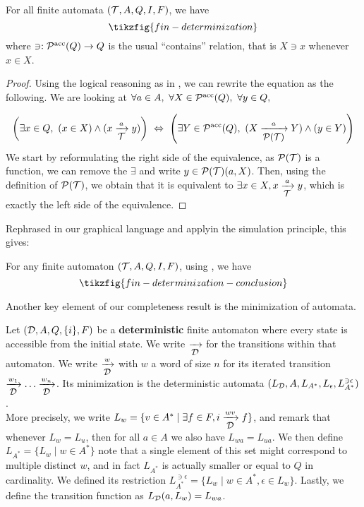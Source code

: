 \begin{proposition}\label{prop:determinization}
	For all finite automata $(\T,A,Q,I,F)$, we have
	\[ \tikzfig{fin-determinization}\]
	where $\ni : \P^{\textup{acc}}(Q) \to Q$ is the usual ``contains'' relation, that is $X \ni x$ whenever $x \in X$.
\end{proposition}
\begin{proof}
	Using the logical reasoning as in , we can rewrite the equation as the following. We are looking at $\forall a\in A,~ \forall X\in \P^{\textup{acc}}(Q),~\forall y\in Q,~$
	
	\[ \left(\exists x\in Q,~ (x\in X) \land (x \xrightarrow[\text{\small$\T$}]{a} y)\right) ~\Leftrightarrow~ \left(\exists Y\in \P^{\textup{acc}}(Q),~   (X \xrightarrow[\text{\small$\P(\T)$}]{a} Y) \land (y\in Y)\right)\]
	We start by reformulating the right side of the equivalence, as $\P(\T)$ is a function, we can remove the $\exists$ and write $y \in \P(\T)(a,X)$. Then, using the definition of $ \P(\T)$, we obtain that it is equivalent to $\exists x \in X, x \xrightarrow[\text{\small$\T$}]{a} y$, which is exactly the left side of the equivalence.
\end{proof}

Rephrased in our graphical language and applyin the simulation principle, this gives:
\begin{corollary}\label{cor:determinization}
	For any finite automaton $(\T,A,Q,I,F)$, using , we have
	\[ \tikzfig{fin-determinization-conclusion}\]
\end{corollary}

Another key element of our completeness result is the minimization of automata.
\begin{definition}[Minimization]	
	Let $(\D,A,Q,\{i\},F)$ be a \textbf{deterministic} finite automaton where every state is accessible from the initial state. We write $\xrightarrow[\text{\small $\D$}]{}$ for the transitions within that automaton. We write  $\xrightarrow[\text{\small $\D$}]{w}$ with $w$ a word of size $n$ for its iterated transition $\xrightarrow[\text{\small $\D$}]{w_1}\dots \xrightarrow[\text{\small $\D$}]{w_n}$. Its minimization is the deterministic automata 
	$ (L_\D,A,L_{A^*},L_{\epsilon},L_{A^*}^{\ni \epsilon}) $.\\
	More precisely, we write $L_w = \{ v \in A^* \mid \exists f \in F, i \xrightarrow[\text{\small $\D$}]{wv} f\}$, and remark that whenever $L_w = L_u$, then for all $a \in A$ we also have $L_{wa} = L_{ua}$. We then define $L_{A^*} = \{ L_w \mid w \in A^*\}$ note that a single element of this set might correspond to multiple distinct $w$, and in fact $L_{A^*}$ is actually smaller or equal to $Q$ in cardinality. We defined its restriction $L_{A^*}^{\ni \epsilon} = \{ L_w \mid w \in A^*, \epsilon \in L_w\}$. Lastly, we define the transition function as $L_\D(a,L_w) =  L_{wa}$.
\end{definition}


